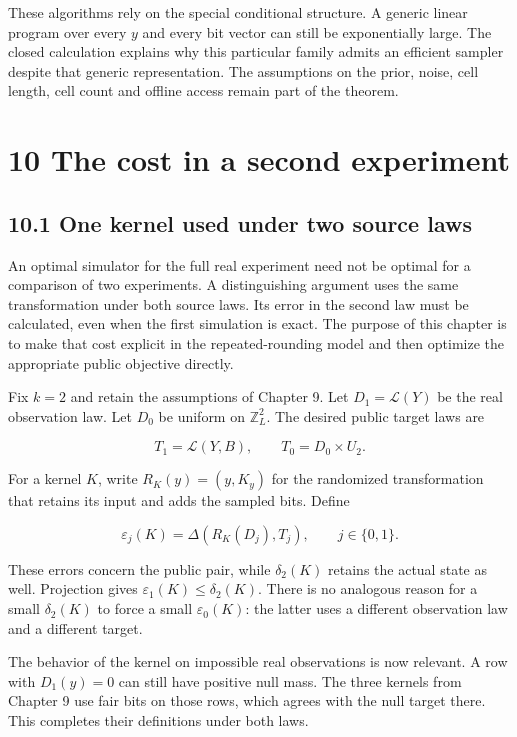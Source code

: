 \documentclass[
]{article}
\begin{document}
These algorithms rely on the special conditional structure. A generic
linear program over every \(y\) and every bit vector can still be
exponentially large. The closed calculation explains why this particular
family admits an efficient sampler despite that generic representation.
The assumptions on the prior, noise, cell length, cell count and offline
access remain part of the theorem.

\section{10 The cost in a second
experiment}\label{the-cost-in-a-second-experiment}

\subsection{10.1 One kernel used under two source
laws}\label{one-kernel-used-under-two-source-laws}

An optimal simulator for the full real experiment need not be optimal
for a comparison of two experiments. A distinguishing argument uses the
same transformation under both source laws. Its error in the second law
must be calculated, even when the first simulation is exact. The purpose
of this chapter is to make that cost explicit in the repeated-rounding
model and then optimize the appropriate public objective directly.

Fix \(k=2\) and retain the assumptions of Chapter 9. Let
\(D_1=\mathcal L(Y)\) be the real observation law. Let \(D_0\) be
uniform on \(\mathbb Z_L^2\). The desired public target laws are

\[
T_1=\mathcal L(Y,B),\qquad T_0=D_0\times U_2.
\]

For a kernel \(K\), write \(R_K(y)=(y,K_y)\) for the randomized
transformation that retains its input and adds the sampled bits. Define

\[
\varepsilon_j(K)=\Delta(R_K(D_j),T_j),\qquad j\in\{0,1\}.
\]

These errors concern the public pair, while \(\delta_2(K)\) retains the
actual state as well. Projection gives
\(\varepsilon_1(K)\le\delta_2(K)\). There is no analogous reason for a
small \(\delta_2(K)\) to force a small \(\varepsilon_0(K)\): the latter
uses a different observation law and a different target.

The behavior of the kernel on impossible real observations is now
relevant. A row with \(D_1(y)=0\) can still have positive null mass. The
three kernels from Chapter 9 use fair bits on those rows, which agrees
with the null target there. This completes their definitions under both
laws.
\end{document}
